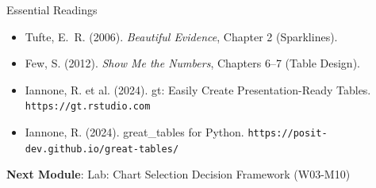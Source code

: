 \documentclass[10pt]{beamer}
\begin{document}
\begin{frame}{Essential Readings}
  \begin{itemize}
    \item Tufte, E.~R. (2006). \emph{Beautiful Evidence}, Chapter 2
          (Sparklines).
    \item Few, S. (2012). \emph{Show Me the Numbers}, Chapters 6--7
          (Table Design).
    \item Iannone, R. et al. (2024). gt: Easily Create
          Presentation-Ready Tables. \texttt{https://gt.rstudio.com}
    \item Iannone, R. (2024). great\_tables for Python.
          \texttt{https://posit-dev.github.io/great-tables/}
  \end{itemize}
  \vspace{6pt}
  \textbf{Next Module}: Lab: Chart Selection Decision Framework (W03-M10)
\end{frame}
\end{document}
